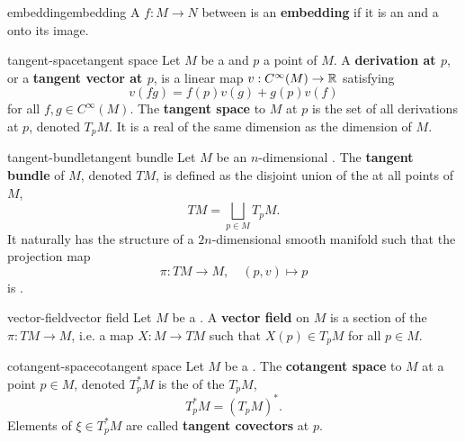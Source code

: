 \begin{topic}{embedding}{embedding}
    A  $f : M \to N$ between  is an \textbf{embedding} if it is an  and a  onto its image.
\end{topic}

\begin{topic}{tangent-space}{tangent space}
    Let $M$ be a  and $p$ a point of $M$. A \textbf{derivation at $p$}, or a \textbf{tangent vector at $p$}, is a linear map $v : C^\infty(M) \to \mathbb{R}$ satisfying
    \[ v(fg) = f(p) v(g) + g(p) v(f) \]
    for all $f, g \in C^\infty(M)$. The \textbf{tangent space} to $M$ at $p$ is the set of all derivations at $p$, denoted $T_p M$. It is a real  of the same dimension as the dimension of $M$.
\end{topic}

\begin{topic}{tangent-bundle}{tangent bundle}
    Let $M$ be an $n$-dimensional . The \textbf{tangent bundle} of $M$, denoted $TM$, is defined as the disjoint union of the  at all points of $M$,
    \[ TM = \bigsqcup_{p \in M} T_p M . \]
    It naturally has the structure of a $2n$-dimensional smooth manifold such that the projection map
    \[ \pi : TM \to M, \quad (p, v) \mapsto p \]
    is .
\end{topic}

\begin{topic}{vector-field}{vector field}
    Let $M$ be a . A \textbf{vector field} on $M$ is a section of the  $\pi : TM \to M$, i.e. a map $X : M \to TM$ such that $X(p) \in T_p M$ for all $p \in M$.
\end{topic}

\begin{topic}{cotangent-space}{cotangent space}
    Let $M$ be a . The \textbf{cotangent space} to $M$ at a point $p \in M$, denoted $T^*_p M$ is the  of the  $T_p M$,
    \[ T^*_p M = (T_p M)^* . \]
    Elements of $\xi \in T^*_p M$ are called \textbf{tangent covectors} at $p$.
\end{topic}

